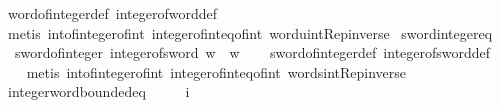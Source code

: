 \begin{isabellebody}
%
\isatagproof
{}\isamarkupfalse%
\ word{\isacharunderscore}{\kern0pt}of{\isacharunderscore}{\kern0pt}integer{\isacharunderscore}{\kern0pt}def\ integer{\isacharunderscore}{\kern0pt}of{\isacharunderscore}{\kern0pt}word{\isacharunderscore}{\kern0pt}def\isanewline
\ \ \isamarkupfalse%
\ {\isacharparenleft}{\kern0pt}metis\ int{\isacharunderscore}{\kern0pt}of{\isacharunderscore}{\kern0pt}integer{\isacharunderscore}{\kern0pt}of{\isacharunderscore}{\kern0pt}int\ integer{\isacharunderscore}{\kern0pt}of{\isacharunderscore}{\kern0pt}int{\isacharunderscore}{\kern0pt}eq{\isacharunderscore}{\kern0pt}of{\isacharunderscore}{\kern0pt}int\ word{\isacharunderscore}{\kern0pt}uint{\isachardot}{\kern0pt}Rep{\isacharunderscore}{\kern0pt}inverse{\isacharprime}{\kern0pt}{\isacharparenright}{\kern0pt}%
\endisatagproof
{\isafoldproof}%
%
\isadelimproof
\isanewline
%
\endisadelimproof
\isanewline
{}\isamarkupfalse%
\ sword{\isacharunderscore}{\kern0pt}integer{\isacharunderscore}{\kern0pt}eq{\isacharcolon}{\kern0pt}\isanewline
\ \ {\isachardoublequoteopen}sword{\isacharunderscore}{\kern0pt}of{\isacharunderscore}{\kern0pt}integer\ {\isacharparenleft}{\kern0pt}integer{\isacharunderscore}{\kern0pt}of{\isacharunderscore}{\kern0pt}sword\ w{\isacharparenright}{\kern0pt}\ {\isacharequal}{\kern0pt}\ w{\isachardoublequoteclose}\isanewline
%
\isadelimproof
\ \ %
\endisadelimproof
%
\isatagproof
{}\isamarkupfalse%
\ sword{\isacharunderscore}{\kern0pt}of{\isacharunderscore}{\kern0pt}integer{\isacharunderscore}{\kern0pt}def\ integer{\isacharunderscore}{\kern0pt}of{\isacharunderscore}{\kern0pt}sword{\isacharunderscore}{\kern0pt}def\isanewline
\ \ \isamarkupfalse%
\ {\isacharparenleft}{\kern0pt}metis\ int{\isacharunderscore}{\kern0pt}of{\isacharunderscore}{\kern0pt}integer{\isacharunderscore}{\kern0pt}of{\isacharunderscore}{\kern0pt}int\ integer{\isacharunderscore}{\kern0pt}of{\isacharunderscore}{\kern0pt}int{\isacharunderscore}{\kern0pt}eq{\isacharunderscore}{\kern0pt}of{\isacharunderscore}{\kern0pt}int\ word{\isacharunderscore}{\kern0pt}sint{\isachardot}{\kern0pt}Rep{\isacharunderscore}{\kern0pt}inverse{\isacharprime}{\kern0pt}{\isacharparenright}{\kern0pt}%
\endisatagproof
{\isafoldproof}%
%
\isadelimproof
\isanewline
%
\endisadelimproof
\isanewline
{}\isamarkupfalse%
\ integer{\isacharunderscore}{\kern0pt}word{\isacharunderscore}{\kern0pt}bounded{\isacharunderscore}{\kern0pt}eq{\isacharcolon}{\kern0pt}\isanewline
\ \ \ {\isachardoublequoteopen}{}\ {\isasymle}\ i{\isachardoublequoteclose}\isanewline

\end{isabellebody}
